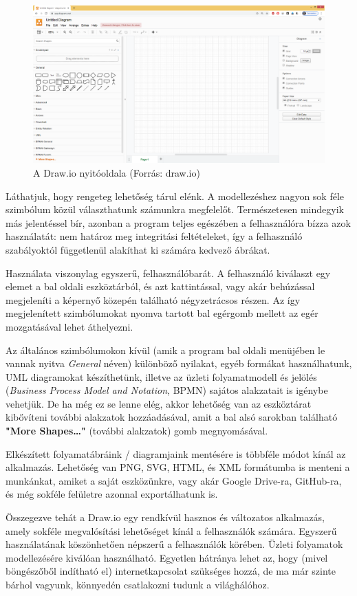 \begin{figure}[h]
\centering
\includegraphics[scale=0.3]{images/drawio.png}
\caption{A Draw.io nyitóoldala (Forrás: draw.io)}
\label{fig:drawio}
\end{figure}

Láthatjuk, hogy rengeteg lehetőség tárul elénk. A modellezéshez nagyon sok féle szimbólum közül választhatunk számunkra megfelelőt. Természetesen mindegyik más jelentéssel bír, azonban a program teljes egészében a felhasználóra bízza azok használatát: nem határoz meg integritási feltételeket, így a felhasználó szabályoktól függetlenül alakíthat ki számára kedvező ábrákat.

Használata viszonylag egyszerű, felhasználóbarát. A felhasználó kiválaszt egy elemet a bal oldali eszköztárból, és azt kattintással, vagy akár behúzással megjeleníti a képernyő közepén található négyzetrácsos részen. Az így megjelenített szimbólumokat nyomva tartott bal egérgomb mellett az egér mozgatásával lehet áthelyezni.

Az általános szimbólumokon kívül (amik a program bal oldali menüjében le vannak nyitva \textit{General} néven) különböző nyilakat, egyéb formákat használhatunk, UML diagramokat készíthetünk, illetve az üzleti folyamatmodell és jelölés (\textit{Business Process Model and Notation}, BPMN) sajátos alakzatait is igénybe vehetjük. De ha még ez se lenne elég, akkor lehetőség van az eszköztárat kibővíteni további alakzatok hozzáadásával, amit a bal alsó sarokban található \textbf{"More Shapes\ldots"} (további alakzatok) gomb megnyomásával.

Elkészített folyamatábráink / diagramjaink mentésére is többféle módot kínál az alkalmazás. Lehetőség van PNG, SVG, HTML, és XML formátumba is menteni a munkánkat, amiket a saját eszközünkre, vagy akár Google Drive-ra, GitHub-ra, és még sokféle felületre azonnal exportálhatunk is.

Összegezve tehát a Draw.io egy rendkívül hasznos és változatos alkalmazás, amely sokféle megvalósítási lehetőséget kínál a felhasználók számára. Egyszerű használatának köszönhetően népszerű a felhasználók körében. Üzleti folyamatok modellezésére kiválóan használható. Egyetlen hátránya lehet az, hogy (mivel böngészőből indítható el) internetkapcsolat szükséges hozzá, de ma már szinte bárhol vagyunk, könnyedén csatlakozni tudunk a világhálóhoz.


